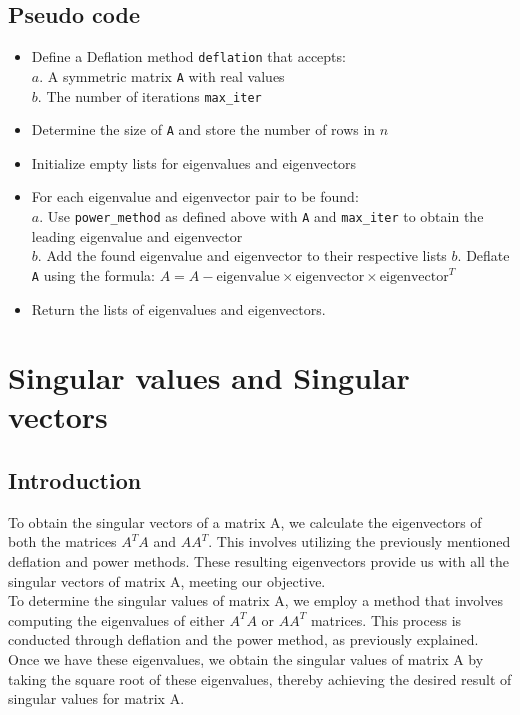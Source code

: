 \documentclass[11pt]{article}
\begin{document}
\subsection{Pseudo code}
\begin{itemize}
    \item Define a Deflation method \texttt{deflation} that accepts:\\
    $a. $ A symmetric matrix \texttt{A} with real values\\
    $b. $ The number of iterations \texttt{max\_iter}
    \item Determine the size of \texttt{A} and store the number of rows in \( n \)
    \item Initialize empty lists for eigenvalues and eigenvectors
    \item For each eigenvalue and eigenvector pair to be found:\\
    $a. $ Use \texttt{power\_method} as defined above with \texttt{A} and \texttt{max\_iter} to obtain the leading eigenvalue and eigenvector \\
    $b. $ Add the found eigenvalue and eigenvector to their respective lists
    $b. $ Deflate \texttt{A} using the formula: \( A = A - \text{eigenvalue} \times \text{eigenvector} \times \text{eigenvector}^T \)
    \item Return the lists of eigenvalues and eigenvectors.
\end{itemize}

\newpage
\section{Singular values and Singular vectors}
\subsection{Introduction}
To obtain the singular vectors of a matrix A, we calculate the eigenvectors of both the matrices $A^{T}A$ and $AA^{T}$. This involves utilizing the previously mentioned deflation and power methods. These resulting eigenvectors provide us with all the singular vectors of matrix A, meeting our objective.\\

To determine the singular values of matrix A, we employ a method that involves computing the eigenvalues of either $A^{T}A$ or $AA^{T}$ matrices. This process is conducted through deflation and the power method, as previously explained. Once we have these eigenvalues, we obtain the singular values of matrix A by taking the square root of these eigenvalues, thereby achieving the desired result of singular values for matrix A.
\end{document}
